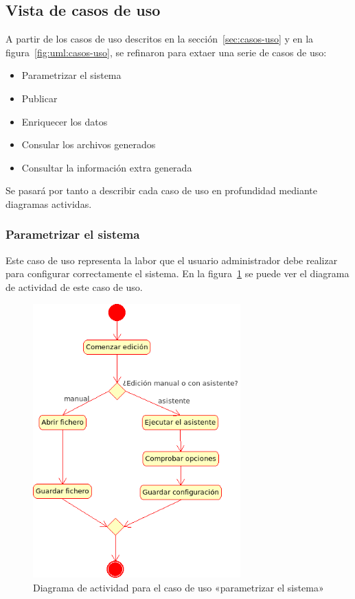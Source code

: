 
\subsection{Vista de casos de uso}

A partir de los casos de uso descritos en la sección~\ref{sec:casos-uso} y 
en la figura~\ref{fig:uml:casos-uso}, se refinaron para extaer una serie 
de casos de uso:

\begin{itemize}
 \item Parametrizar el sistema
 \item Publicar
 \item Enriquecer los datos
 \item Consular los archivos generados
 \item Consultar la información extra generada
\end{itemize}

Se pasará por tanto a describir cada caso de uso en profundidad mediante diagramas
actividas.

\subsubsection{Parametrizar el sistema}

Este caso de uso representa la labor que el usuario administrador debe realizar 
para configurar correctamente el sistema. En la figura~\ref{fig:uml:parametrizar-sistema}
se puede ver el diagrama de actividad de este caso de uso.

\begin{figure}[ht]
 	\centering
	\includegraphics[width=8cm]{images/uml/casos-uso/parametrizar-sistema.png}
	\caption{Diagrama de actividad para el caso de uso «parametrizar el sistema»}
	\label{fig:uml:parametrizar-sistema}
\end{figure}

